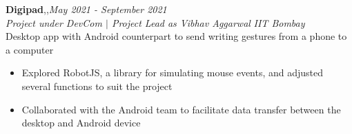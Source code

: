 \textbf{Digipad}\sep\njs\sep\elec \hfill{\sl \small May 2021 - September 2021}\\
{\it Project under DevCom $|$ Project Lead as Vibhav Aggarwal}  \hfill{\it IIT Bombay}\\
\vspace{-8pt}
\emerrow Desktop app with Android counterpart to send writing gestures from a phone to a computer
\begin{itemize}[itemsep = -1.7 mm, leftmargin=*]
\item Explored RobotJS, a library for simulating mouse events, and adjusted several functions to suit the project
\item Collaborated with the Android team to facilitate data transfer between the desktop and Android device
\end{itemize}